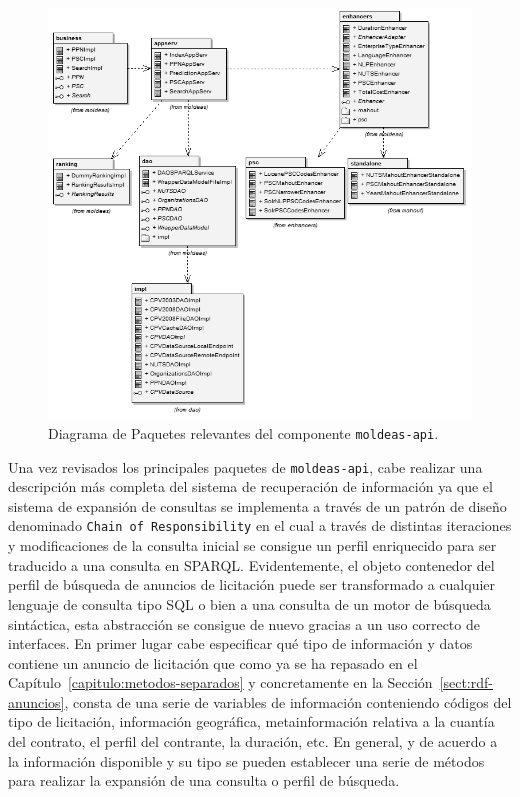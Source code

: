\begin{figure}[!htb]
\centering
	\includegraphics[width=16cm]{images/phd/moldeas/moldeas-api-packages}
\caption{Diagrama de Paquetes relevantes del componente \texttt{moldeas-api}.}
\label{fig:moldeas-api-packages}
\end{figure}

Una vez revisados los principales paquetes de \texttt{moldeas-api}, cabe realizar una descripción 
más completa del sistema de recuperación de información ya que el sistema de expansión de consultas 
se implementa a través de un patrón de diseño denominado \texttt{Chain of Responsibility} en el cual 
a través de distintas iteraciones y modificaciones de la consulta inicial se consigue un perfil 
enriquecido para ser traducido a una consulta en SPARQL. Evidentemente, el objeto contenedor 
del perfil de búsqueda de anuncios de licitación puede ser transformado a cualquier lenguaje de 
consulta tipo SQL o bien a una consulta de un motor de búsqueda sintáctica, esta abstracción 
se consigue de nuevo gracias a un uso correcto de interfaces. En primer lugar cabe especificar 
qué tipo de información y datos contiene un anuncio de licitación que como ya se ha repasado en 
el Capítulo~\ref{capitulo:metodos-separados} y concretamente en la Sección~\ref{sect:rdf-anuncios}, consta 
de una serie de variables de información conteniendo códigos del tipo de licitación, información geográfica, 
metainformación relativa a la cuantía del contrato, el perfil del contrante, la duración, etc. En general, 
y de acuerdo a la información disponible y su tipo se pueden establecer una serie de métodos para realizar la expansión 
de una consulta o perfil de búsqueda.

